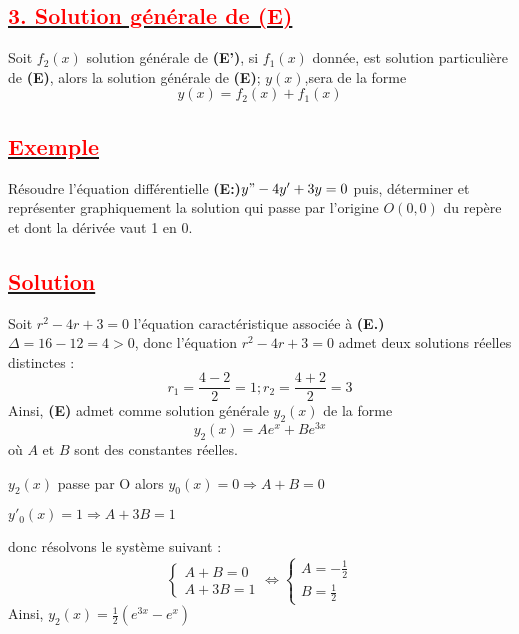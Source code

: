 \documentclass[12pt]{article}
\begin{document}
\subsection*{\underline{\textbf{\textcolor{red}{3. Solution générale de (E)}}}}
Soit $f_{2}(x)$ solution générale de \textbf{(E')}, si $f_{1}(x)$ donnée, est solution particulière de \textbf{(E)}, alors la solution générale de \textbf{(E)}; $y(x)$,sera de la forme \[y(x)=f_{2}(x)+f_{1}(x) \]
\subsection*{\underline{\textbf{\textcolor{red}{Exemple}}}}
Résoudre l'équation différentielle \textbf{(E:)}$y"-4y'+3y=0$ puis, déterminer et représenter graphiquement la solution qui passe par l'origine $O(0,0)$ du repère et dont la dérivée vaut 1 en 0.
\subsection*{\underline{\textbf{\textcolor{red}{Solution}}}}
Soit $r^{2}-4r+3=0$ l'équation caractéristique associée à \textbf{(E.)}
$\Delta = 16-12=4>0$, donc l'équation $r^{2}-4r+3=0$ admet deux solutions réelles distinctes :
\[r_{1}=\frac{4-2}{2}=1; r_{2}=\frac{4+2}{2}=3\]
Ainsi, \textbf{(E)} admet comme solution générale $y_{2}(x)$ de la forme \[y_{2}(x)=Ae^{x}+Be^{3x}\]
où $A$ et $B$ sont des constantes réelles.

$y_{2}(x)$ passe par O alors $y_{0}(x)=0 \Longrightarrow A+B=0$

$y'_{0}(x)=1 \Longrightarrow  A+3B=1$

donc résolvons le système suivant :
\[
\begin{cases}
    A+B=0 \\
    A+3B=1
\end{cases}
\Leftrightarrow 
\begin{cases}
    A=-\frac{1}{2} \\
    B=\frac{1}{2}
\end{cases}
\]
Ainsi, $y_{2}(x)=\frac{1}{2}(e^{3x}-e^{x})$
\end{document}
